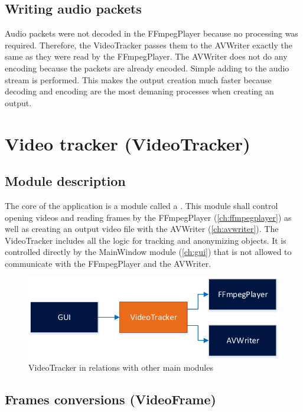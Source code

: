 \section{Writing audio packets}
Audio packets were not decoded in the FFmpegPlayer because no processing was required. Therefore, the VideoTracker passes them to the AVWriter exactly the same as they were read by the FFmpegPlayer. The AVWriter does not do any encoding because the packets are already encoded. Simple adding to the audio stream is performed. This makes the output creation much faster because decoding and encoding are the most demaning processes when creating an output.


\chapter{Video tracker (VideoTracker)}\label{ch:videotracker}
\section{Module description}
The core of the application is a module called a . This module shall control opening videos and reading frames by the FFmpegPlayer (\autoref{ch:ffmpegplayer}) as well as creating an output video file with the AVWriter (\autoref{ch:avwriter}). The VideoTracker includes all the logic for tracking and anonymizing objects. It is controlled directly by the MainWindow module (\autoref{ch:gui}) that is not allowed to communicate with the FFmpegPlayer and the AVWriter.
\begin{figure}[!htbp]
\centering
\includegraphics{fig/videotracker}
\caption{VideoTracker in relations with other main modules}
\label{fig:videotracker}
\end{figure}

\section{Frames conversions (VideoFrame)}\label{sec:videoframe}
